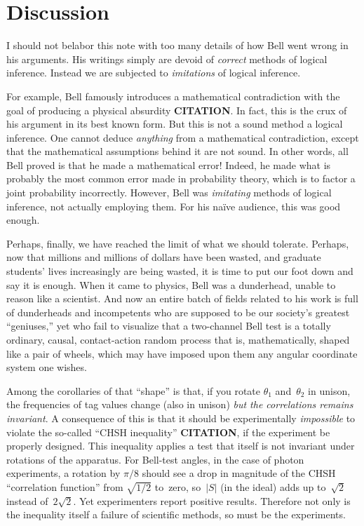 \documentclass[9pt,technote]{IEEEtran}
\begin{document}
\section{Discussion}

I should not belabor this note with too many details of how Bell went
wrong in his arguments. His writings simply are devoid of
{\em{correct}} methods of logical inference. Instead we are subjected
to {\em{imitations}} of logical inference.

For example, Bell famously introduces a mathematical contradiction
with the goal of producing a physical absurdity {\bf{CITATION}}. In
fact, this is the crux of his argument in its best known form. But
this is not a sound method a logical inference. One cannot deduce
{\em{anything}} from a mathematical contradiction, except that the
mathematical assumptions behind it are not sound. In other words, all
Bell proved is that he made a mathematical error! Indeed, he made what
is probably the most common error made in probability theory, which is
to factor a joint probability incorrectly. However, Bell was
{\em{imitating}} methods of logical inference, not actually employing
them. For his naïve audience, this was good enough.

Perhaps, finally, we have reached the limit of what we should
tolerate. Perhaps, now that millions and millions of dollars have been
wasted, and graduate students' lives increasingly are being wasted, it
is time to put our foot down and say it is enough. When it came to
physics, Bell was a dunderhead, unable to reason like a scientist. And
now an entire batch of fields related to his work is full of
dunderheads and incompetents who are supposed to be our society’s
greatest ``geniuses,'' yet who fail to visualize that a two-channel
Bell test is a totally ordinary, causal, contact-action random process
that is, mathematically, shaped like a pair of wheels, which may have
imposed upon them any angular coordinate system one wishes.

Among the corollaries of that ``shape'' is that, if you rotate
$\theta_1$ and~$\theta_2$ in unison, the frequencies of tag values
change (also in unison) {\em{but the correlations remains
    invariant}}. A consequence of this is that it should be
experimentally {\em{impossible}} to violate the so-called ``CHSH
inequality'' {\bf{CITATION}}, if the experiment be properly
designed. This inequality applies a test that itself is not invariant
under rotations of the apparatus. For Bell-test angles, in the case of
photon experiments, a rotation by $\pi\!/8$ should see a drop in
magnitude of the CHSH ``correlation function'' from $\sqrt{1\!/2}$
to~zero, so~$|S|$ (in the ideal) adds up to~$\sqrt2$ instead
of~$2\sqrt2$. Yet experimenters report positive results. Therefore not
only is the inequality itself a failure of scientific methods, so must
be the experiments.
\end{document}
